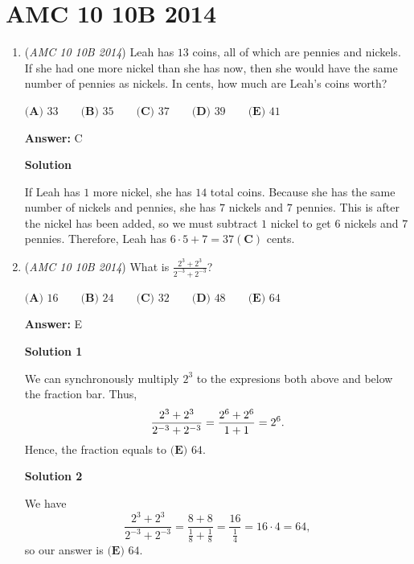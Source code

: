 \section{AMC 10 10B 2014}
        \begin{enumerate}
        	\item (\textit{AMC 10 10B 2014}) Leah has $13$ coins, all of  which are pennies and nickels. If she had one more nickel than she has now, then she would have the same number of pennies as nickels. In cents, how much are Leah's coins worth?


 $\textbf {(A) } 33 \qquad \textbf {(B) } 35 \qquad \textbf {(C) } 37 \qquad \textbf {(D) } 39 \qquad \textbf {(E) } 41$

 \textbf{Answer: }C



\textbf{Solution}

If Leah has $1$ more nickel, she has $14$ total coins. Because she has the same number of nickels and pennies, she has $7$ nickels and $7$ pennies. This is after the nickel has been added, so we must subtract $1$ nickel to get $6$ nickels and $7$ pennies. Therefore, Leah has $6\cdot5+7=\boxed{37 (\textbf{C})}$ cents.

 


 


	\item (\textit{AMC 10 10B 2014}) What is $\frac{2^3 + 2^3}{2^{-3} + 2^{-3}}$?


 $\textbf {(A) } 16 \qquad \textbf {(B) } 24 \qquad \textbf {(C) } 32 \qquad \textbf {(D) } 48 \qquad \textbf {(E) } 64$

 \textbf{Answer: }E



\textbf{Solution 1}

We can synchronously multiply ${2^3}$ to the expresions both above and below the fraction bar. Thus, 
 \[\frac{2^3+2^3}{2^{-3}+2^{-3}}\\=\frac{2^6+2^6}{1+1}\\={2^6}.\]Hence, the fraction equals to $\boxed{{\textbf{(E) }64}}$.

 



\textbf{Solution 2}

We have 
 \[\frac{2^3+2^3}{2^{-3}+2^{-3}} = \frac{8 + 8}{\frac{1}{8} + \frac{1}{8}} = \frac{16}{\frac{1}{4}} = 16 \cdot 4 = 64,\] so our answer is $\boxed{{(\textbf{E) }64}}$.

 



\end{enumerate}

